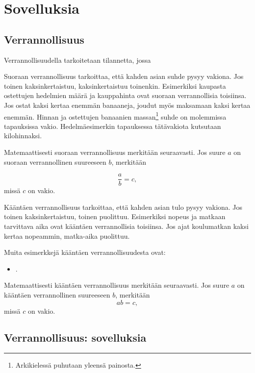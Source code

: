 %
\part{Sovelluksia}
%
%
\chapter{Verrannollisuus}

Verrannollisuudella tarkoitetaan tilannetta, jossa 

Suoraan verrannollisuus tarkoittaa, että kahden asian suhde pysyy vakiona. Jos toinen kaksinkertaistuu, kaksinkertaistuu toinenkin. Esimerkiksi kaupasta ostettujen hedelmien määrä ja kauppahinta ovat suoraan verrannollisia toisiinsa. Jos ostat kaksi kertaa enemmän banaaneja, joudut myös maksamaan kaksi kertaa enemmän. Hinnan ja ostettujen banaanien massan\footnote{Arkikielessä puhutaan yleensä painosta.} suhde on molemmissa tapauksissa vakio. Hedelmäesimerkin tapauksessa tätävakiota kutsutaan kilohinnaksi.

Matemaattisesti suoraan verrannollisuus merkitään seuraavasti. Jos suure $a$ on suoraan verrannollinen suureeseen $b$, merkitään

\begin{equation}
    \frac{a}{b}=c,
\end{equation}
missä $c$ on vakio.

Kääntäen verrannollisuus tarkoittaa, että kahden asian tulo pysyy vakiona. Jos toinen kaksinkertaistuu, toinen puolittuu. Esimerkiksi nopeus ja matkaan tarvittava aika ovat kääntäen verrannollisia toisiinsa. Jos ajat koulumatkan kaksi kertaa nopeammin, matka-aika puolittuu.

Muita esimerkkejä kääntäen verrannollisuudesta ovat:
\begin{itemize}
    \item .
\end{itemize}

Matemaattisesti kääntäen verrannollisuus merkitään seuraavasti. Jos suure $a$ on kääntäen verrannollinen suureeseen $b$, merkitään
\begin{equation}
    ab=c,
\end{equation}
missä $c$ on vakio.


\chapter{Verrannollisuus: sovelluksia}

